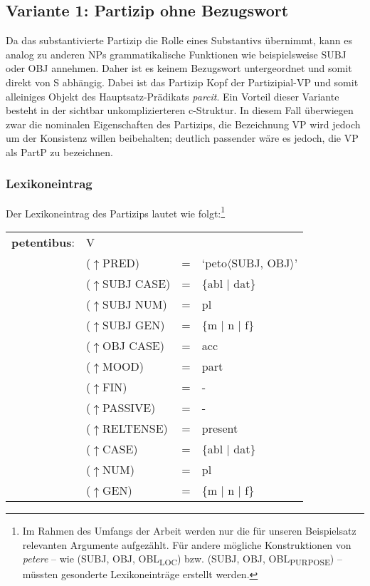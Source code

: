 \documentclass[12pt,a4paper]{article}
\begin{document}
\subsection{Variante 1: Partizip ohne Bezugswort}
Da das substantivierte Partizip die Rolle eines Substantivs übernimmt, kann es analog zu anderen NPs grammatikalische Funktionen wie beispielsweise SUBJ oder OBJ annehmen. Daher ist es keinem Bezugswort untergeordnet und somit direkt von S abhängig. Dabei ist das Partizip Kopf der Partizipial-VP und somit alleiniges Objekt des Hauptsatz-Prädikats \textit{parcit}. Ein Vorteil dieser Variante besteht in der sichtbar unkomplizierteren c-Struktur. In diesem Fall überwiegen zwar die nominalen Eigenschaften des Partizips, die Bezeichnung VP wird jedoch um der Konsistenz willen beibehalten; deutlich passender wäre es jedoch, die VP als PartP zu bezeichnen.
\newpage
\subsubsection{Lexikoneintrag}
Der Lexikoneintrag des Partizips lautet wie folgt:\footnote{Im Rahmen des Umfangs der Arbeit werden nur die für unseren Beispielsatz relevanten Argumente aufgezählt. Für andere mögliche Konstruktionen von \textit{petere} -- wie (SUBJ, OBJ, OBL\textsubscript{LOC}) bzw. (SUBJ, OBJ, OBL\textsubscript{PURPOSE}) -- müssten gesonderte Lexikoneinträge erstellt werden.}
\begin{singlespace}
\begin{tabular}{ l  l  l  l  } 
\textbf{petentibus}: & \: V \\
$\qquad$ & \:  ($\uparrow$PRED) & = & `peto$\langle$SUBJ, OBJ$\rangle$' \\
$\qquad$ & \:  ($\uparrow$SUBJ CASE) & = & \{abl $\mid$ dat\} \\
$\qquad$ & \:  ($\uparrow$SUBJ NUM) & = & pl \\
$\qquad$ & \:  ($\uparrow$SUBJ GEN) & = & \{m $\mid$ n $\mid$ f\} \\
$\qquad$ & \:  ($\uparrow$OBJ CASE) & = & acc \\
$\qquad$ & \:  ($\uparrow$MOOD) & = & part\\
$\qquad$ & \:  ($\uparrow$FIN) & = & - \\
$\qquad$ & \:  ($\uparrow$PASSIVE) & = & - \\
$\qquad$ & \:  ($\uparrow$RELTENSE) & = & present \\ 
$\qquad$ & \:  ($\uparrow$CASE) & = & \{abl $\mid$ dat\} \\
$\qquad$ & \:  ($\uparrow$NUM) & = & pl \\
$\qquad$ & \:  ($\uparrow$GEN) & = & \{m $\mid$ n $\mid$ f\} \\
\end{tabular}
\newline
\newline
\end{singlespace}
\end{document}
